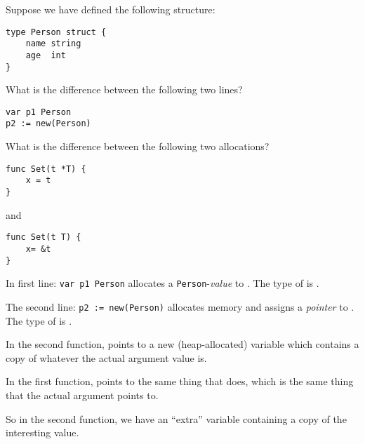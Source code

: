 \begin{Exercise}[title={Pointers},difficulty=6]
\label{ex:pointers}

\Question
Suppose we have defined the following structure:
\begin{lstlisting}
type Person struct {
    name string
    age	 int
}
\end{lstlisting}

What is the difference between the following two lines?
\begin{lstlisting}
var p1 Person
p2 := new(Person)
\end{lstlisting}

\Question
What is the difference between the following two allocations?
\begin{lstlisting}[numbers=none]
func Set(t *T) {
    x = t
}
\end{lstlisting}
and
\begin{lstlisting}[numbers=none]
func Set(t T) {
    x= &t
}
\end{lstlisting}
\end{Exercise}

\begin{Answer}
\Question
In first line: \lstinline{var p1 Person} allocates a
\texttt{Person}-\emph{value} to . The type of  is
.

The second line: \lstinline{p2 := new(Person)} allocates memory
and assigns a \emph{pointer} to . The type of  is
.

\Question
In the second function,  points to a new
(heap-allocated) variable  which contains
a copy of whatever the actual argument value is.

In the first function,  points to the same thing
that  does, which is the same thing that the actual
argument points to.

So in the second function, we have an ``extra'' variable
containing a copy of the interesting value.
\end{Answer}
